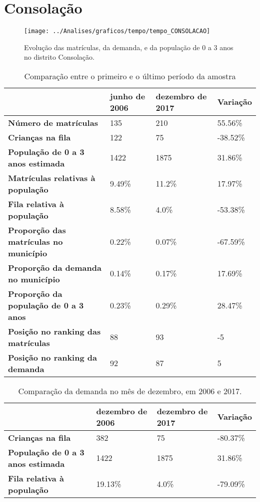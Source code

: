 \section{Consolação}
\begin{figure}[H]
\centering
\texttt{[image: ../Analises/graficos/tempo/tempo\_CONSOLACAO]}
\caption{Evolução das matrículas, da demanda, e da população de 0 a 3 anos no distrito Consolação.}
\end{figure}
\begin{table}[H]
\begin{tabular}{|l|l|l|l|}
\hline
\textbf{}                                      & \textbf{junho de 2006}       & \textbf{dezembro de 2017}    & \textbf{Variação} \\ \hline
\textbf{Número de matrículas}                  & 135 & 210 & 55.56\% \\ \hline
\textbf{Crianças na fila}                      & 122 & 75 & -38.52\% \\ \hline
\textbf{População de 0 a 3 anos estimada}      & 1422 & 1875 & 31.86\% \\ \hline
\textbf{Matrículas relativas à população}      & 9.49\% & 11.2\% & 17.97\% \\ \hline
\textbf{Fila relativa à população}             & 8.58\% & 4.0\% & -53.38\% \\ \hline
\textbf{Proporção das matrículas no município} & 0.22\% & 0.07\% & -67.59\% \\ \hline
\textbf{Proporção da demanda no município}     & 0.14\% & 0.17\% & 17.69\% \\ \hline
\textbf{Proporção da população de 0 a 3 anos}  & 0.23\% & 0.29\% & 28.47\% \\ \hline
\textbf{Posição no ranking das matrículas}     & 88 & 93 & -5 \\ \hline
\textbf{Posição no ranking da demanda}         & 92 & 87 & 5 \\ \hline
\end{tabular}
\caption{Comparação entre o primeiro e o último período da amostra}
\end{table}
\begin{table}[H]
\begin{tabular}{|l|l|l|l|}
\hline
\textbf{}                                 & \textbf{dezembro de 2006} & \textbf{dezembro de 2017} & \textbf{Variação} \\ \hline
\textbf{Crianças na fila}                      & 382 & 75 & -80.37\% \\ \hline
\textbf{População de 0 a 3 anos estimada}      & 1422 & 1875 & 31.86\% \\ \hline
\textbf{Fila relativa à população}             & 19.13\% & 4.0\% & -79.09\% \\ \hline
\end{tabular}
\caption{Comparação da demanda no mês de dezembro, em 2006 e 2017.}
\end{table}
